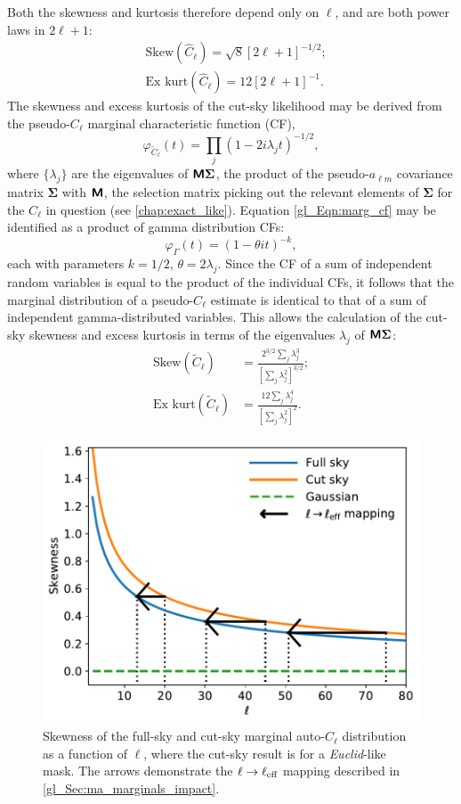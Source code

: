 Both the skewness and kurtosis therefore depend only on $\ell$, and are both power laws in $2 \ell + 1$:
\begin{align}
&\text{Skew} \left( \widehat{C}_\ell \right)
= \sqrt{8} \left[ 2 \ell + 1 \right]^{- 1/2};
\label{gl_Eqn:skew_fs} \\
&\text{Ex kurt} \left( \widehat{C}_\ell \right)
= 12 \left[ 2 \ell + 1 \right]^{-1}.
\label{gl_Eqn:kurt_fs}
\end{align}
The skewness and excess kurtosis of the cut-sky likelihood may be derived from the pseudo-$C_\ell$ marginal characteristic function (CF),
\begin{equation}
\varphi_{\widetilde{C}_\ell} \left( t \right) = \prod_j
\left( 1 - 2i \lambda_j t \right)^{-1/2},
\label{gl_Eqn:marg_cf}
\end{equation}
where $\{ \lambda_j \}$ are the eigenvalues of
$\bm{\mathsf{M}} \bm{\Sigma}$, the product of the pseudo-$a_{\ell m}$ covariance matrix $\bm{\Sigma}$ with $\bm{\mathsf{M}}$, the selection matrix picking out the relevant elements of $\bm{\Sigma}$ for the $C_\ell$ in question (see \autoref{chap:exact_like}). Equation \eqref{gl_Eqn:marg_cf} may be identified as a product of gamma distribution CFs:
\begin{equation}
\varphi_\Gamma \left( t \right) =
\left( 1 - \theta i t \right)^{-k},
\end{equation}
each with parameters $k = 1/2$, $\theta = 2 \lambda_j$. Since the CF of a sum of independent random variables is equal to the product of the individual CFs, it follows that the marginal distribution of a pseudo-$C_\ell$ estimate is identical to that of a sum of independent gamma-distributed variables. This allows the calculation of the cut-sky skewness and excess kurtosis in terms of the eigenvalues $\lambda_j$ of $\bm{\mathsf{M}} \bm{\Sigma}$:
\begin{align}
\text{Skew} \left( \widetilde{C}_\ell \right)
&= \frac{ 2^{3/2} \sum_j \lambda_j ^3 }
{ \left[ \sum_j \lambda_j^2 \right]^{3 / 2}};
\label{gl_Eqn:skew_ma} \\[1em]
\text{Ex kurt} \left( \widetilde{C}_\ell \right)
&= \frac{12 \sum_j \lambda_j^4}
{\left[ \sum_j \lambda_j^2 \right]^2}.
\label{gl_Eqn:kurt_ma}
\end{align}

\begin{figure}
\centering
\includegraphics[width=.5\textwidth]{skewness}
\caption{Skewness of the full-sky and cut-sky marginal auto-$C_\ell$ distribution as a function of $\ell$, where the cut-sky result is for a \textit{Euclid}-like mask. The arrows demonstrate the $\ell \rightarrow \ell_\text{eff}$ mapping described in \autoref{gl_Sec:ma_marginals_impact}.}
\label{gl_Fig:skewness}
\end{figure}

